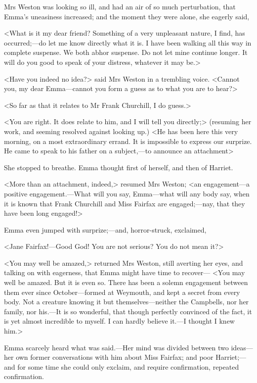 Mrs Weston was looking so ill, and had an air of so much perturbation, that Emma's uneasiness increased; and the moment they were alone, she eagerly said,

<What is it my dear friend? Something of a very unpleasant nature, I find, has occurred;—do let me know directly what it is. I have been walking all this way in complete suspense. We both abhor suspense. Do not let mine continue longer. It will do you good to speak of your distress, whatever it may be.>

<Have you indeed no idea?> said Mrs Weston in a trembling voice. <Cannot you, my dear Emma—cannot you form a guess as to what you are to hear?>

<So far as that it relates to Mr Frank Churchill, I do guess.>

<You are right. It does relate to him, and I will tell you directly;> (resuming her work, and seeming resolved against looking up.) <He has been here this very morning, on a most extraordinary errand. It is impossible to express our surprize. He came to speak to his father on a subject,—to announce an attachment\longdash>

She stopped to breathe. Emma thought first of herself, and then of Harriet.

<More than an attachment, indeed,> resumed Mrs Weston; <an engagement—a positive engagement.—What will you say, Emma—what will any body say, when it is known that Frank Churchill and Miss Fairfax are engaged;—nay, that they have been long engaged!>

Emma even jumped with surprize;—and, horror-struck, exclaimed,

<Jane Fairfax!—Good God! You are not serious? You do not mean it?>

<You may well be amazed,> returned Mrs Weston, still averting her eyes, and talking on with eagerness, that Emma might have time to recover— <You may well be amazed. But it is even so. There has been a solemn engagement between them ever since October—formed at Weymouth, and kept a secret from every body. Not a creature knowing it but themselves—neither the Campbells, nor her family, nor his.—It is so wonderful, that though perfectly convinced of the fact, it is yet almost incredible to myself. I can hardly believe it.—I thought I knew him.>

Emma scarcely heard what was said.—Her mind was divided between two ideas—her own former conversations with him about Miss Fairfax; and poor Harriet;—and for some time she could only exclaim, and require confirmation, repeated confirmation.

